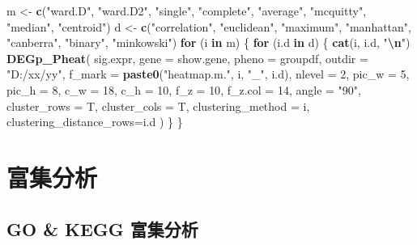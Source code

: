 \documentclass[
]{book}
\newenvironment{Shaded}{\begin{snugshade}}{\end{snugshade}}
\newcommand{\AttributeTok}[1]{\textcolor[rgb]{0.13,0.29,0.53}{#1}}
\newcommand{\ControlFlowTok}[1]{\textcolor[rgb]{0.13,0.29,0.53}{\textbf{#1}}}
\newcommand{\DecValTok}[1]{\textcolor[rgb]{0.00,0.00,0.81}{#1}}
\newcommand{\FunctionTok}[1]{\textcolor[rgb]{0.13,0.29,0.53}{\textbf{#1}}}
\newcommand{\NormalTok}[1]{#1}
\newcommand{\OtherTok}[1]{\textcolor[rgb]{0.56,0.35,0.01}{#1}}
\newcommand{\SpecialCharTok}[1]{\textcolor[rgb]{0.81,0.36,0.00}{\textbf{#1}}}
\newcommand{\StringTok}[1]{\textcolor[rgb]{0.31,0.60,0.02}{#1}}
\begin{document}
\begin{Shaded}
\begin{Highlighting}[]
\NormalTok{m }\OtherTok{\textless{}{-}} \FunctionTok{c}\NormalTok{(}\StringTok{"ward.D"}\NormalTok{, }\StringTok{"ward.D2"}\NormalTok{, }\StringTok{"single"}\NormalTok{, }\StringTok{"complete"}\NormalTok{, }
\StringTok{"average"}\NormalTok{, }\StringTok{"mcquitty"}\NormalTok{, }
\StringTok{"median"}\NormalTok{, }\StringTok{"centroid"}\NormalTok{)}
\NormalTok{d }\OtherTok{\textless{}{-}} \FunctionTok{c}\NormalTok{(}\StringTok{"correlation"}\NormalTok{, }\StringTok{"euclidean"}\NormalTok{, }\StringTok{"maximum"}\NormalTok{, }\StringTok{"manhattan"}\NormalTok{,}
       \StringTok{"canberra"}\NormalTok{, }\StringTok{"binary"}\NormalTok{, }\StringTok{"minkowski"}\NormalTok{)}
\ControlFlowTok{for}\NormalTok{ (i }\ControlFlowTok{in}\NormalTok{ m) \{}
  \ControlFlowTok{for}\NormalTok{ (i.d }\ControlFlowTok{in}\NormalTok{ d) \{}
    \FunctionTok{cat}\NormalTok{(i, i.d, }\StringTok{"}\SpecialCharTok{\textbackslash{}n}\StringTok{"}\NormalTok{)}
    \FunctionTok{DEGp\_Pheat}\NormalTok{(}
\NormalTok{      sig.expr,}
      \AttributeTok{gene =}\NormalTok{ show.gene, }
      \AttributeTok{pheno =}\NormalTok{ groupdf,}
      \AttributeTok{outdir =} \StringTok{"D:/xx/yy"}\NormalTok{,}
      \AttributeTok{f\_mark =} \FunctionTok{paste0}\NormalTok{(}\StringTok{"heatmap.m."}\NormalTok{, i, }\StringTok{"\_"}\NormalTok{, i.d),}
      \AttributeTok{nlevel =} \DecValTok{2}\NormalTok{,}
      \AttributeTok{pic\_w =} \DecValTok{5}\NormalTok{,}
      \AttributeTok{pic\_h =} \DecValTok{8}\NormalTok{,}
      \AttributeTok{c\_w =} \DecValTok{18}\NormalTok{,}
      \AttributeTok{c\_h =} \DecValTok{10}\NormalTok{,}
      \AttributeTok{f\_z =} \DecValTok{10}\NormalTok{,}
      \AttributeTok{f\_z.col =} \DecValTok{14}\NormalTok{,}
      \AttributeTok{angle =} \StringTok{"90"}\NormalTok{,}
      \AttributeTok{cluster\_rows =}\NormalTok{ T,}
      \AttributeTok{cluster\_cols =}\NormalTok{ T,}
      \AttributeTok{clustering\_method =}\NormalTok{ i,}
      \AttributeTok{clustering\_distance\_rows=}\NormalTok{i.d}
\NormalTok{    )  }
\NormalTok{  \}}
\NormalTok{\}}
\end{Highlighting}
\end{Shaded}

\chapter{富集分析}\label{enrich}

\section{GO \& KEGG 富集分析}\label{enrich-auto}
\end{document}
